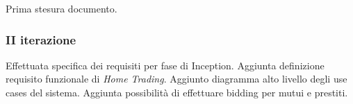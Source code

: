 \documentclass[10pt]{softeng} %
\begin{document}
Prima stesura documento.

\subsubsection{II iterazione}

Effettuata specifica dei requisiti per fase di Inception.
Aggiunta definizione requisito funzionale di \emph{Home Trading}.
Aggiunto diagramma alto livello degli use cases del sistema.
Aggiunta possibilit\`a di effettuare bidding per mutui e prestiti.

%
%
%
%
%
%
%
%
%
%
\end{document}
